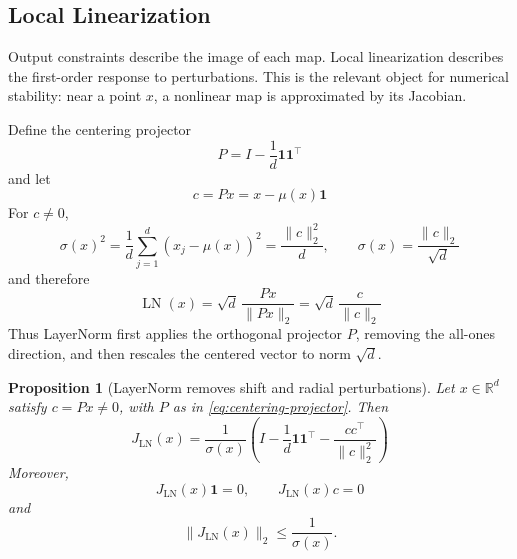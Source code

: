 \documentclass[11pt]{article}
\newtheorem{proposition}{Proposition}
\newcommand{\R}{\mathbb{R}}
\newcommand{\one}{\mathbf{1}}
\newcommand{\LN}{\operatorname{LN}}
\begin{document}
\subsection{Local Linearization}

Output constraints describe the image of each map. Local linearization describes the first-order response to perturbations. This is the relevant object for numerical stability: near a point \(x\), a nonlinear map is approximated by its Jacobian.

Define the centering projector
\begin{equation}
    P=I-\frac{1}{d}\one\one^\top
\label{eq:centering-projector}
\end{equation}
and let
\[
    c=Px=x-\mu(x)\one
\]
For \(c\neq 0\),
\[
    \sigma(x)^2
    =
    \frac{1}{d}\sum_{j=1}^d (x_j-\mu(x))^2
    =
    \frac{\|c\|_2^2}{d},
    \qquad
    \sigma(x)=\frac{\|c\|_2}{\sqrt d}
\]
and therefore
\begin{equation}
    \LN(x)
    =
    \sqrt d\,\frac{Px}{\|Px\|_2}
    =
    \sqrt d\,\frac{c}{\|c\|_2}
\label{eq:ln-projection-rescaling}
\end{equation}
Thus LayerNorm first applies the orthogonal projector \(P\), removing the all-ones direction, and then rescales the centered vector to norm \(\sqrt d\).

\begin{proposition}[LayerNorm removes shift and radial perturbations]
Let \(x\in\R^d\) satisfy \(c=Px\neq 0\), with \(P\) as in \eqref{eq:centering-projector}. Then
\begin{equation}
    J_{\LN}(x)
    =
    \frac{1}{\sigma(x)}
    \left(
        I-\frac{1}{d}\one\one^\top
        -\frac{cc^\top}{\|c\|_2^2}
    \right)
\label{eq:ln-jacobian}
\end{equation}
Moreover,
\begin{equation}
    J_{\LN}(x)\one=0,
    \qquad
    J_{\LN}(x)c=0
\label{eq:ln-jacobian-null}
\end{equation}
and
\begin{equation}
    \|J_{\LN}(x)\|_2\leq \frac{1}{\sigma(x)}.
\label{eq:ln-jacobian-norm}
\end{equation}
\end{proposition}
\end{document}
